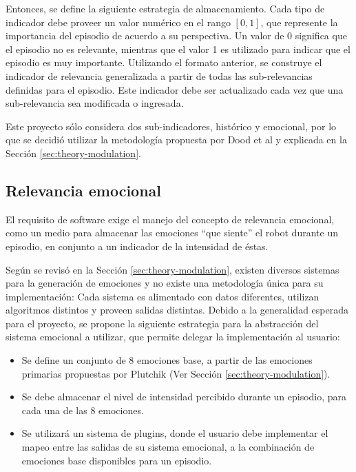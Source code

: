 Entonces, se define la siguiente estrategia de almacenamiento. Cada tipo de indicador debe proveer un valor numérico en el rango $[0, 1]$, que represente la importancia del episodio de acuerdo a su perspectiva. Un valor de 0 significa que el episodio no es relevante, mientras que el valor 1 es utilizado para indicar que el episodio es muy importante. Utilizando el formato anterior, se construye el indicador de relevancia generalizada a partir de todas las sub-relevancias definidas para el episodio. Este indicador debe ser actualizado cada vez que una sub-relevancia sea modificada o ingresada.

Este proyecto sólo considera dos sub-indicadores, histórico y emocional, por lo que se decidió utilizar la metodología propuesta por Dood et al y explicada en la Sección \ref{sec:theory-modulation}.


\subsection{Relevancia emocional}\label{sec:design_ep_rel_emo}

El requisito de software  exige el manejo del concepto de relevancia emocional, como un medio para almacenar las emociones ``que siente'' el robot durante un episodio, en conjunto a un indicador de la intensidad de éstas.


Según se revisó en la Sección \ref{sec:theory-modulation}, existen diversos sistemas para la generación de emociones y no existe una metodología única para su implementación: Cada sistema es alimentado con datos diferentes, utilizan algoritmos distintos y proveen salidas distintas. Debido a la generalidad esperada para el proyecto, se propone la siguiente estrategia para la abstracción del sistema emocional a utilizar, que permite delegar la implementación al usuario:
\begin{itemize}
\item Se define un conjunto de 8 emociones base, a partir de las emociones primarias propuestas por Plutchik (Ver Sección \ref{sec:theory-modulation}).
\item Se debe almacenar el nivel de intensidad percibido durante un episodio, para cada una de las 8 emociones.
\item Se utilizará un sistema de plugins, donde el usuario debe implementar el mapeo entre las salidas de su sistema emocional, a la combinación de emociones base disponibles para un episodio.
\end{itemize}

